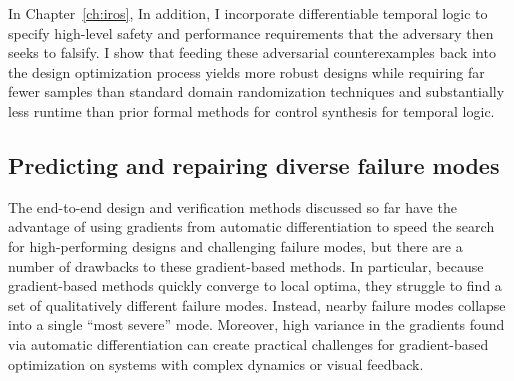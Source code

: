 In Chapter~\ref{ch:iros},  In addition, I incorporate differentiable temporal logic to specify high-level safety and performance requirements that the adversary then seeks to falsify. I show that feeding these adversarial counterexamples back into the design optimization process yields more robust designs while requiring far fewer samples than standard domain randomization techniques and substantially less runtime than prior formal methods for control synthesis for temporal logic. 

\subsection{Predicting and repairing diverse failure modes}

The end-to-end design and verification methods discussed so far have the advantage of using gradients from automatic differentiation to speed the search for high-performing designs and challenging failure modes, but there are a number of drawbacks to these gradient-based methods. In particular, because gradient-based methods quickly converge to local optima, they struggle to find a set of qualitatively different failure modes. Instead, nearby failure modes collapse into a single ``most severe'' mode. Moreover, high variance in the gradients found via automatic differentiation can create practical challenges for gradient-based optimization on systems with complex dynamics or visual feedback. 

